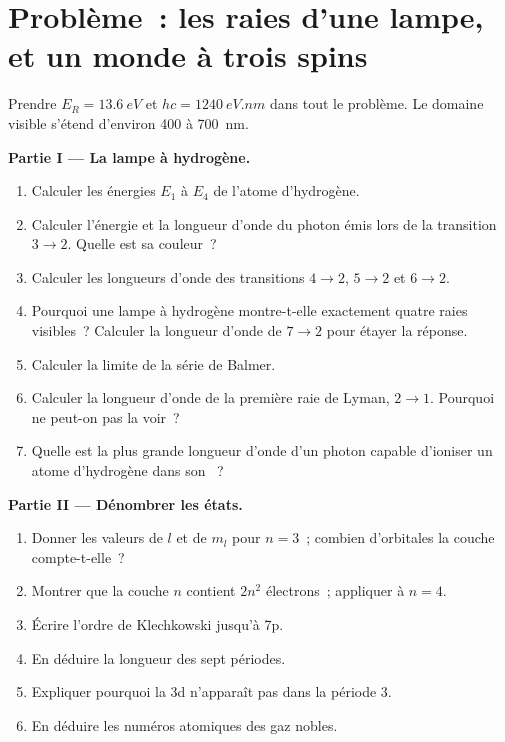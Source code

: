 \section{Problème~: les raies d'une lampe, et un monde à trois spins}

\begin{problem}
\label{pb:b1:quantum-numbers:1}
Prendre $E_R = \qty{13.6}{eV}$ et $hc = \qty{1240}{eV.nm}$ dans tout le
problème. Le domaine visible s'étend d'environ 400 à \qty{700}{nm}.

\medskip
\noindent\textbf{Partie I --- La lampe à hydrogène.}
\begin{enumerate}
  \item Calculer les énergies $E_1$ à $E_4$ de l'atome d'hydrogène.
  \item Calculer l'énergie et la longueur d'onde du photon émis lors de
        la transition $3 \to 2$. Quelle est sa couleur~?
  \item Calculer les longueurs d'onde des transitions $4 \to 2$, $5 \to 2$
        et $6 \to 2$.
  \item Pourquoi une lampe à hydrogène montre-t-elle exactement quatre
        raies visibles~? Calculer la longueur d'onde de $7 \to 2$ pour
        étayer la réponse.
  \item Calculer la limite de la série de Balmer.
  \item Calculer la longueur d'onde de la première raie de Lyman, $2 \to 1$.
        Pourquoi ne peut-on pas la voir~?
  \item Quelle est la plus grande longueur d'onde d'un photon capable
        d'ioniser un atome d'hydrogène dans son ~?
\end{enumerate}

\medskip
\noindent\textbf{Partie II --- Dénombrer les états.}
\begin{enumerate}[resume]
  \item Donner les valeurs de $l$ et de $m_l$ pour $n = 3$~; combien
        d'orbitales la couche compte-t-elle~?
  \item Montrer que la couche $n$ contient $2n^2$ électrons~; appliquer
        à $n = 4$.
  \item Écrire l'ordre de Klechkowski jusqu'à 7p.
  \item En déduire la longueur des sept périodes.
  \item Expliquer pourquoi la  3d n'apparaît pas dans la
        période 3.
  \item En déduire les numéros atomiques des gaz nobles.
\end{enumerate}


\end{problem}
